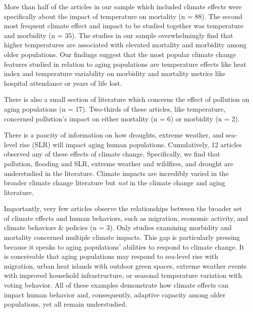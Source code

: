 \documentclass[12pt]{article}
\begin{document}
More than half of the articles in our sample which included climate
effects were specifically about the impact of temperature on mortality
(n = 88). The second most frequent climate effect and impact to be
studied together was temperature and morbidity (n = 35). The studies in
our sample overwhelmingly find that higher temperatures are associated
with elevated mortality and morbidity among older populations. Our
findings suggest that the most popular climate change features studied
in relation to aging populations are temperature effects like heat index
and temperature variability on morbidity and mortality metrics like
hospital attendance or years of life lost.

There is also a small section of literature which concerns the effect of
pollution on aging populations (n = 17). Two-thirds of these articles,
like temperature, concerned pollution's impact on either mortality (n =
6) or morbidity (n = 2).

There is a paucity of information on how droughts, extreme weather, and
sea-level rise (SLR) will impact aging human populations. Cumulatively,
12 articles observed any of these effects of climate change.
Specifically, we find that pollution, flooding and SLR, extreme weather
and wildfires, and drought are understudied in the literature. Climate
impacts are incredibly varied in the broader climate change literature
but \emph{not} in the climate change and aging literature.

Importantly, very few articles observe the relationships between the
broader set of climate effects and human behaviors, such as migration,
economic activity, and climate behaviors \& policies (n = 3). Only
studies examining morbidity and mortality concerned multiple climate
impacts. This gap is particularly pressing because it speaks to aging
populations' abilities to respond to climate change. It is conceivable
that aging populations may respond to sea-level rise with migration,
urban heat islands with outdoor green spaces, extreme weather events
with improved household infrastructure, or seasonal temperature
variation with voting behavior. All of these examples demonstrate how
climate effects can impact human behavior and, consequently, adaptive
capacity among older populations, yet all remain understudied.
\end{document}

